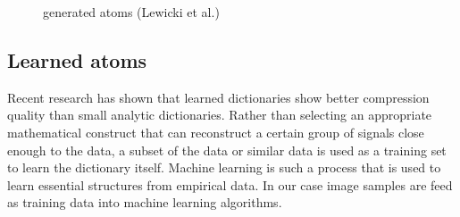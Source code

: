 \begin{figure}
\centering
{}
\hspace{5mm}
\hspace{5mm}
\caption{generated atoms (Lewicki et al.\cite{Lewicki1999})}
\label{fig:generated_atoms}
\end{figure}

\subsection{Learned atoms}
Recent research\cite{Chen1998,Aharon2006,Mairal2010} has shown that learned
dictionaries show better compression quality than small analytic
dictionaries. Rather than selecting an appropriate mathematical construct that
can reconstruct a certain group of signals close enough to the data, a subset of
the data or similar data is used as a training set to learn the dictionary
itself.
Machine learning is such a process that is used to learn essential structures
from empirical data. In our case image samples are feed as training data into
machine learning algorithms.

